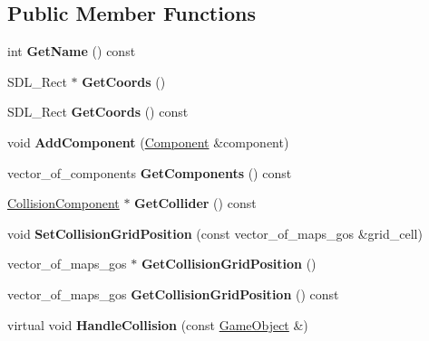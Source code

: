 \subsection*{Public Member Functions}
\begin{DoxyCompactItemize}
\item 
\hypertarget{class_game_object_a1fae8627f0de98cedd1457f7253556f3}{}int {\bfseries Get\+Name} () const \label{class_game_object_a1fae8627f0de98cedd1457f7253556f3}

\item 
\hypertarget{class_game_object_a77e945de9f52202defdafeb36d0cca5b}{}S\+D\+L\+\_\+\+Rect $\ast$ {\bfseries Get\+Coords} ()\label{class_game_object_a77e945de9f52202defdafeb36d0cca5b}

\item 
\hypertarget{class_game_object_a4fad55526c42fc5baf1499bc8ab3173c}{}S\+D\+L\+\_\+\+Rect {\bfseries Get\+Coords} () const \label{class_game_object_a4fad55526c42fc5baf1499bc8ab3173c}

\item 
\hypertarget{class_game_object_a411545b4436e623739e5983f2231804f}{}void {\bfseries Add\+Component} (\hyperlink{class_component}{Component} \&component)\label{class_game_object_a411545b4436e623739e5983f2231804f}

\item 
\hypertarget{class_game_object_a1afb5a377cf4f2d8655ca8d5a4e0f088}{}vector\+\_\+of\+\_\+components {\bfseries Get\+Components} () const \label{class_game_object_a1afb5a377cf4f2d8655ca8d5a4e0f088}

\item 
\hypertarget{class_game_object_a6692f17490344d6e95251f9f3d215d2b}{}\hyperlink{class_collision_component}{Collision\+Component} $\ast$ {\bfseries Get\+Collider} () const \label{class_game_object_a6692f17490344d6e95251f9f3d215d2b}

\item 
\hypertarget{class_game_object_ade27cb8f0cd61893efd4c2dee6c0f522}{}void {\bfseries Set\+Collision\+Grid\+Position} (const vector\+\_\+of\+\_\+maps\+\_\+gos \&grid\+\_\+cell)\label{class_game_object_ade27cb8f0cd61893efd4c2dee6c0f522}

\item 
\hypertarget{class_game_object_ab964b02bf537844e8fa159cfa192778d}{}vector\+\_\+of\+\_\+maps\+\_\+gos $\ast$ {\bfseries Get\+Collision\+Grid\+Position} ()\label{class_game_object_ab964b02bf537844e8fa159cfa192778d}

\item 
\hypertarget{class_game_object_af722f1a052cc4933b1dd6c2bf866b0ba}{}vector\+\_\+of\+\_\+maps\+\_\+gos {\bfseries Get\+Collision\+Grid\+Position} () const \label{class_game_object_af722f1a052cc4933b1dd6c2bf866b0ba}

\item 
\hypertarget{class_game_object_a38e4c210f6bb0508ca3868653cd83a06}{}virtual void {\bfseries Handle\+Collision} (const \hyperlink{class_game_object}{Game\+Object} \&)\label{class_game_object_a38e4c210f6bb0508ca3868653cd83a06}

\end{DoxyCompactItemize}
